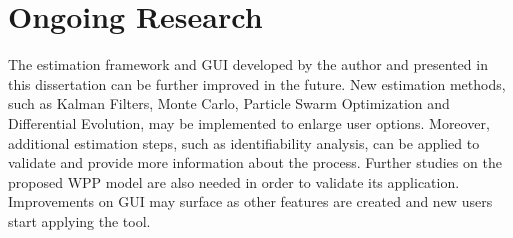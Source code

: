 \chapter{Ongoing Research}
\label{ch: Ongoing}

The estimation framework and GUI developed by the author and presented in this dissertation can be further improved in the future. New estimation methods, such as Kalman Filters, Monte Carlo, Particle Swarm Optimization and Differential Evolution, may be implemented to enlarge user options. Moreover, additional estimation steps, such as identifiability analysis, can be applied to validate and provide more information about the process. Further studies on the proposed WPP model are also needed in order to validate its application. Improvements on GUI may surface as other features are created and new users start applying the tool.